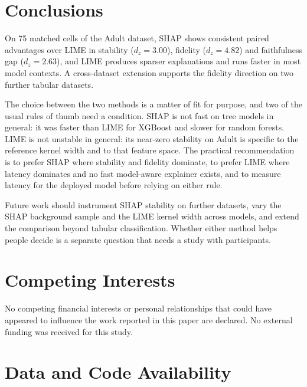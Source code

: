 \documentclass[11pt,a4paper]{article}
\begin{document}
\section{Conclusions}
\label{sec:conclusion}

On 75 matched cells of the Adult dataset, SHAP shows consistent paired
advantages over LIME in stability ($d_z = 3.00$), fidelity ($d_z = 4.82$)
and faithfulness gap ($d_z = 2.63$), and LIME produces sparser explanations
and runs faster in most model contexts. A cross-dataset extension supports
the fidelity direction on two further tabular datasets.

The choice between the two methods is a matter of fit for purpose, and two
of the usual rules of thumb need a condition. SHAP is not fast on tree
models in general: it was faster than LIME for XGBoost and slower for
random forests. LIME is not unstable in general: its near-zero stability on
Adult is specific to the reference kernel width and to that feature space.
The practical recommendation is to prefer SHAP where stability and fidelity
dominate, to prefer LIME where latency dominates and no fast model-aware
explainer exists, and to measure latency for the deployed model before
relying on either rule.

Future work should instrument SHAP stability on further datasets, vary the
SHAP background sample and the LIME kernel width across models, and extend
the comparison beyond tabular classification. Whether either method helps
people decide is a separate question that needs a study with participants.


\section*{Competing Interests}

No competing financial interests or personal relationships that could have
appeared to influence the work reported in this paper are declared. No
external funding was received for this study.

\section*{Data and Code Availability}
\label{sec:artifacts}
\end{document}
